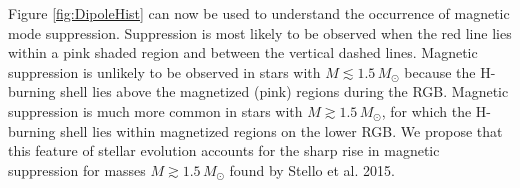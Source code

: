 Figure \ref{fig:DipoleHist} can now be used to understand the occurrence of magnetic mode suppression. Suppression is most likely to be observed when the red line lies within a pink shaded region and between the vertical dashed lines. Magnetic suppression is unlikely to be observed in stars with $M \lesssim 1.5 \, M_\odot$ because the H-burning shell lies above the magnetized (pink) regions during the RGB. Magnetic suppression is much more common in stars with $M \gtrsim 1.5 \, M_\odot$, for which the H-burning shell lies within magnetized regions on the lower RGB. We propose that this feature of stellar evolution accounts for the sharp rise in magnetic suppression for masses $M \gtrsim 1.5 \, M_\odot$ found by Stello et al. 2015.

    